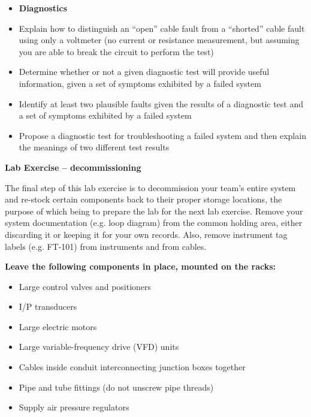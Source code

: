 \filbreak

\begin{itemize}
\item{} {\bf Diagnostics}
\item{} Explain how to distinguish an ``open'' cable fault from a ``shorted'' cable fault using only a voltmeter (no current or resistance measurement, but assuming you are able to break the circuit to perform the test)
\item{} Determine whether or not a given diagnostic test will provide useful information, given a set of symptoms exhibited by a failed system
\item{} Identify at least two plausible faults given the results of a diagnostic test and a set of symptoms exhibited by a failed system
\item{} Propose a diagnostic test for troubleshooting a failed system and then explain the meanings of two different test results
\end{itemize}



\vfil \eject

\noindent
{\bf Lab Exercise -- decommissioning}

\vskip 5pt

The final step of this lab exercise is to decommission your team's entire system and re-stock certain components back to their proper storage locations, the purpose of which being to prepare the lab for the next lab exercise.  Remove your system documentation (e.g. loop diagram) from the common holding area, either discarding it or keeping it for your own records.  Also, remove instrument tag labels (e.g. FT-101) from instruments and from cables.

\vskip 10pt

\indent
{\bf Leave the following components in place, mounted on the racks:}

\begin{itemize}
\item{} Large control valves and positioners
\item{} I/P transducers
\item{} Large electric motors
\item{} Large variable-frequency drive (VFD) units
\item{} Cables inside conduit interconnecting junction boxes together
\item{} Pipe and tube fittings (do not unscrew pipe threads)
\item{} Supply air pressure regulators
\end{itemize}

